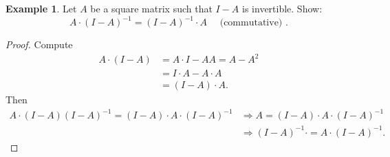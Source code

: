 \documentclass[12pt]{article}
\theoremstyle{definition}
\newtheorem*{example}{Example}
\begin{document}
\begin{example}
Let $A$ be a square matrix such that $I - A$ is invertible. Show:
\[
A \cdot (I - A)^{-1} = (I - A)^{-1} \cdot A \quad \text{ (commutative) }.
\]
\begin{proof}
Compute
\begin{align*}
A \cdot (I - A) &= A \cdot I - AA = A - A^2 \\
&= I \cdot A - A \cdot A \\
&= (I - A) \cdot A.
\end{align*}
Then 
\begin{align*}
A \cdot (I - A)(I - A)^{-1} = (I - A) \cdot A \cdot (I - A)^{-1} &\Rightarrow
A = (I - A) \cdot A \cdot (I - A)^{-1} \\
&\Rightarrow (I - A)^{-1} \cdot = A \cdot (I - A)^{-1}.
\end{align*}
\end{proof}
\end{example}
\end{document}
